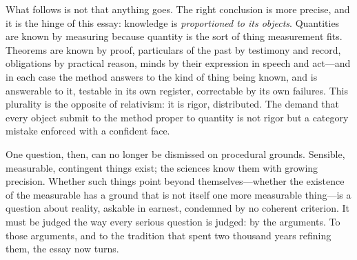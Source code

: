 What follows is not that anything goes. The right conclusion is more precise, and it is the hinge of this essay: knowledge is \emph{proportioned to its objects}. Quantities are known by measuring because quantity is the sort of thing measurement fits. Theorems are known by proof, particulars of the past by testimony and record, obligations by practical reason, minds by their expression in speech and act---and in each case the method answers to the kind of thing being known, and is answerable to it, testable in its own register, correctable by its own failures. This plurality is the opposite of relativism: it is rigor, distributed. The demand that every object submit to the method proper to quantity is not rigor but a category mistake enforced with a confident face.

One question, then, can no longer be dismissed on procedural grounds. Sensible, measurable, contingent things exist; the sciences know them with growing precision. Whether such things point beyond themselves---whether the existence of the measurable has a ground that is not itself one more measurable thing---is a question about reality, askable in earnest, condemned by no coherent criterion. It must be judged the way every serious question is judged: by the arguments. To those arguments, and to the tradition that spent two thousand years refining them, the essay now turns.
